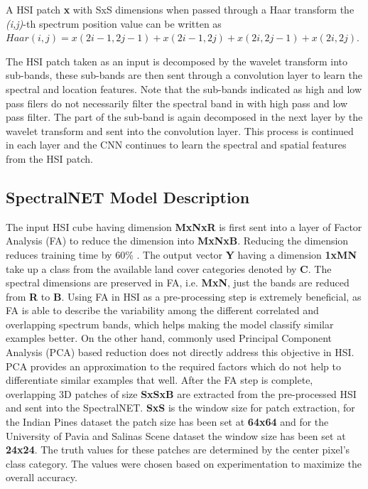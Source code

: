 \documentclass[journal]{IEEEtran}
\begin{document}
A HSI patch \textbf{x} with SxS dimensions when passed through a Haar transform the \textit{(i,j)}-th spectrum position value can be written as $Haar(\mathit{i,j}) = x(2i-1, 2j-1) + x(2i-1, 2j) + x(2i, 2j-1) + x(2i, 2j)$.
 

The HSI patch taken as an input is decomposed by the wavelet transform into sub-bands, these sub-bands are then sent through a convolution layer to learn the spectral and location features. Note that the sub-bands indicated as high and low pass filers do not necessarily filter the spectral band in with high pass and low pass filter. The part of the sub-band is again decomposed in the next layer by the wavelet transform and sent into the convolution layer. This process is continued in each layer and the CNN continues to learn the spectral and spatial features from the HSI patch.


\subsection{SpectralNET Model Description}
The input HSI cube having dimension \textbf{MxNxR} is first sent into a layer of Factor Analysis (FA) to reduce the dimension into \textbf{MxNxB}. Reducing the dimension reduces training time by 60\% \cite{10.1007/978-3-030-14118-9_2}. The output vector \textbf{Y} having a dimension \textbf{1xMN} take up a class from the available land cover categories denoted by \textbf{C}. The spectral dimensions are preserved in FA, i.e. \textbf{MxN}, just the bands are reduced from \textbf{R} to \textbf{B}. Using FA in HSI as a pre-processing step is extremely beneficial, as FA is able to describe the variability among the different correlated and overlapping spectrum bands, which helps making the model classify similar examples better. On the other hand, commonly used Principal Component Analysis (PCA) based reduction does not directly address this objective in HSI. PCA provides an approximation to the required factors which do not help to differentiate similar examples that well. After the FA step is complete, overlapping 3D patches of size \textbf{SxSxB} are extracted from the pre-processed HSI and sent into the SpectralNET. \textbf{SxS} is the window size for patch extraction, for the Indian Pines dataset the patch size has been set at \textbf{64x64} and for the University of Pavia and Salinas Scene dataset the window size has been set at \textbf{24x24}. The truth values for these patches are determined by the center pixel's class category. The values were chosen based on experimentation to maximize the overall accuracy. 
\end{document}
